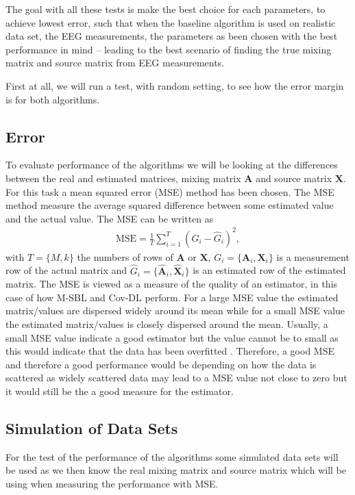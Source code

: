 The goal with all these tests is make the best choice for each parameters, to achieve lowest error, such that when the baseline algorithm is used on realistic data set, the EEG measurements, the parameters as been chosen with the best performance in mind -- leading to the best scenario of finding the true mixing matrix and source matrix from EEG measurements.

First at all, we will run a test, with random setting, to see how the error margin is for both algorithms.

\subsection{Error}
To evaluate performance of the algorithms we will be looking at the differences between the real and estimated matrices, mixing matrix $\mathbf{A}$ and source matrix $\mathbf{X}$.
For this task a mean squared error (MSE) method has been chosen. 
The MSE method measure the average squared difference between some estimated value and the actual value. 
The MSE can be written as
\begin{align*}
\text{MSE} = \frac{1}{T} \sum_{i=1}^T (G_i - \hat{G}_i)^2,  
\end{align*}
with $T = \{M, k\}$ the numbers of rows of $\mathbf{A}$ or $\mathbf{X}$, $G_i = \{ \mathbf{A}_i, \mathbf{X}_i\}$ is a measurement row of the actual matrix and $\hat{G}_i = \{\hat{\mathbf{A}}_i,\hat{\mathbf{X}}_i\}$ is an estimated row of the estimated matrix.
The MSE is viewed as a measure of the quality of an estimator, in this case of how M-SBL and Cov-DL perform. 
For a large MSE value the estimated matrix/values are dispersed widely around its mean while for a small MSE value the estimated matrix/values is closely dispersed around the mean. 
Usually, a small MSE value indicate a good estimator but the value cannot be to small as this would indicate that the data has been overfitted . 
Therefore, a good MSE and therefore a good performance would be depending on how the data is scattered as widely scattered data may lead to a MSE value not close to zero but it would still be the a good measure for the estimator.

\subsection{Simulation of Data Sets}\label{sec:dataset}
For the test of the performance of the algorithms some simulated data sets will be used as we then know the real mixing matrix and source matrix which will be using when measuring the performance with MSE.


